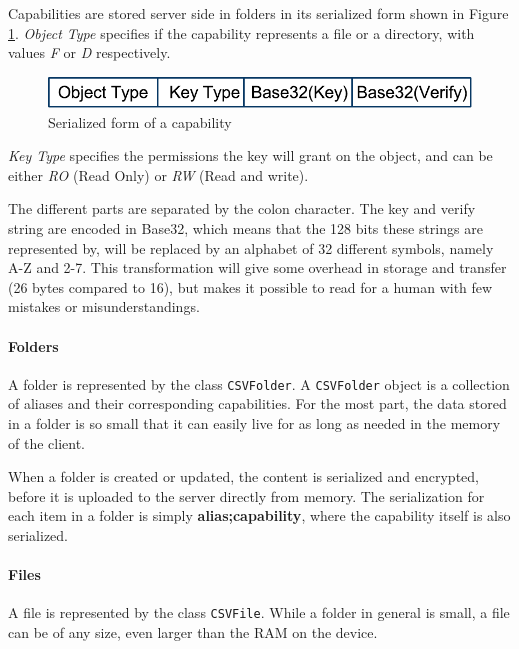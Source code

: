 \documentclass[pdftex,english,10pt,b5paper,twoside]{book}
\begin{document}
Capabilities are stored server side in folders in its serialized form shown
in Figure \ref{fig:CAP:serial}. \emph{Object Type} specifies if the capability
represents a file or a directory, with values \emph{F} or \emph{D}
respectively.

\begin{figure}[h!]
    \centering
    \includegraphics[scale=0.6]{CapabilitySerialization.pdf}
    \caption{Serialized form of a capability}
    \label{fig:CAP:serial}
\end{figure}

\emph{Key Type} specifies the permissions the key will grant on the object, and
can be either \emph{RO} (Read Only) or \emph{RW} (Read and write).

The different parts are separated by the colon character. The key and
verify string are encoded in Base32, which means that the 128 bits these
strings are represented by, will be replaced by an alphabet of 32 different
symbols, namely A-Z and 2-7. This transformation will give some overhead in
storage and transfer (26 bytes compared to 16), but makes it possible to read for a human
with few mistakes or misunderstandings.

\paragraph{Folders}

A folder is represented by the class \texttt{CSVFolder}. A \texttt{CSVFolder} object is
a collection of aliases and their corresponding capabilities. For
the most part, the data stored in a folder is so small that it can easily live for
as long as needed in the memory of the client.

When a folder is created or updated, the content is serialized and encrypted,
before it is uploaded to the server directly from memory. The serialization for
each item in a folder is simply \textbf{alias;capability}, where the capability
itself is also serialized.

\paragraph{Files}

A file is represented by the class \texttt{CSVFile}. While a folder in general is small,
a file can be of any size, even larger than the \ac{RAM} on the device.
\end{document}
